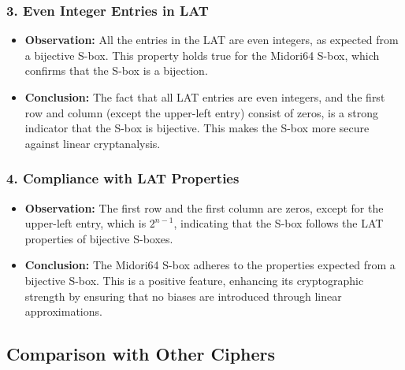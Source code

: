 \subsubsection*{3. Even Integer Entries in LAT}
\begin{itemize}
	\item \textbf{Observation:} All the entries in the LAT are even integers, as
	      expected from a bijective S-box. This property holds true for the Midori64
	      S-box, which confirms that the S-box is a bijection.
	\item \textbf{Conclusion:} The fact that all LAT entries are even integers,
	      and the first row and column (except the upper-left entry) consist of zeros,
	      is a strong indicator that the S-box is bijective. This makes the S-box more
	      secure against linear cryptanalysis.
\end{itemize}

\subsubsection*{4. Compliance with LAT Properties}
\begin{itemize}
	\item \textbf{Observation:} The first row and the first column are zeros,
	      except for the upper-left entry, which is $2^{n-1}$, indicating that the
	      S-box follows the LAT properties of bijective S-boxes.
	\item \textbf{Conclusion:} The Midori64 S-box adheres to the properties
	      expected from a bijective S-box. This is a positive feature, enhancing its
	      cryptographic strength by ensuring that no biases are introduced through
	      linear approximations.
\end{itemize}


\subsection*{Comparison with Other Ciphers}

